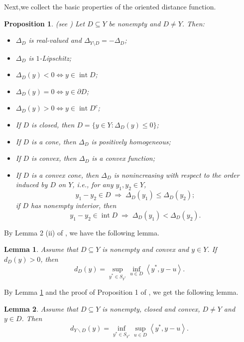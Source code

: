 \documentclass[11pt]{article}
\newtheorem{lemma}{Lemma}[section]
\newtheorem{proposition}{Proposition}[section]
\begin{document}
Next,we collect the basic properties of the oriented distance function.
\begin{proposition}  (see \cite{XuLi2016, KTZ2015, Zaffaroni2003})  \label{XSQ}
	Let $D \subseteq Y$ be nonempty and $D \neq Y$. Then:
	\begin{itemize}
		\item[(i)] $\Delta_D$ is real-valued and $\Delta_{Y \setminus D} = -\Delta_D$;
		\item[(ii)] $\Delta_D$ is $1$-Lipschitz;
		\item[(iii)] $\Delta_D(y) < 0 \Leftrightarrow y \in \operatorname{int} D$;
		\item[(iv)] $\Delta_D(y) = 0 \Leftrightarrow y \in \partial D$;
		\item[(v)] $\Delta_D(y) > 0 \Leftrightarrow y \in \operatorname{int} D^c$;
		\item[(vi)] If $D$ is closed, then $D = \{y \in Y : \Delta_D(y) \leq 0\}$;
		\item[(vii)] If $D$ is a cone, then $\Delta_D$ is positively homogeneous;
		\item[(viii)] If $D$ is convex, then $\Delta_D$ is a convex function;
		\item[(ix)] If $D$ is a convex cone, then $\Delta_D$ is nonincreasing with respect to the order induced by $D$ on $Y$, i.e., for any $y_1, y_2 \in Y$,
		\[
		y_1 - y_2 \in D \;\Longrightarrow\; \Delta_D(y_1) \leq \Delta_D(y_2);
		\]
		if $D$ has nonempty interior, then
		\[
		y_1 - y_2 \in \operatorname{int} D \;\Longrightarrow\; \Delta_D(y_1) < \Delta_D(y_2).
		\]
	\end{itemize}
\end{proposition}




By Lemma 2 (ii) of \cite{LiuNgYang2009}, we have the following lemma.

\begin{lemma}  \label{QWED} Assume that  $D \subseteq Y$  is nonempty and convex and  $y \in Y$. If ${d_D}\left( y \right) > 0$,  then
	$${d_D}\left( y \right) = \mathop {\sup }\limits_{{y^*} \in {S_{{Y^*}}}} \mathop {\inf }\limits_{u \in D} \left\langle {{y^*},y - u} \right\rangle .$$	
\end{lemma}

By Lemma  \ref{QWED} and the proof of Proposition 1  of \cite{LiuNgYang2009}, we   get the following lemma.  
\begin{lemma}  \label{QWAD} Assume that  $D \subseteq Y$  is nonempty, closed and convex, $D \ne Y$
	and  $y \in D$. Then
	$${d_{Y\backslash D}}(y) = \mathop {\inf }\limits_{{y^*} \in {S_{{Y^*}}}} \mathop {\sup }\limits_{u \in D} \left\langle {{y^*},y - u} \right\rangle .$$
\end{lemma}
 
\end{document}
